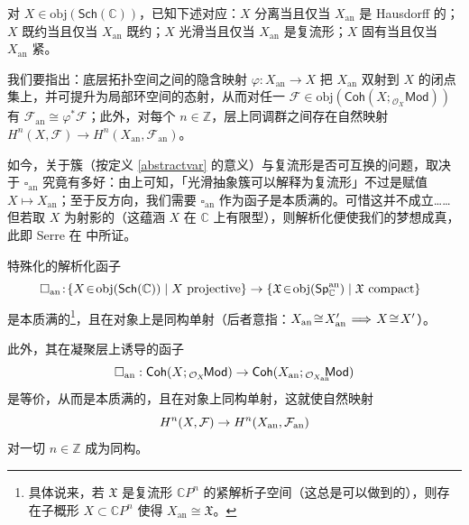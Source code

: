 对 $X\in\text{obj}(\mathsf{Sch}(\mathbb{C}))$，已知下述对应：$X$ 分离当且仅当 $X_\text{an}$ 是 Hausdorff 的；$X$ 既约当且仅当 $X_\text{an}$ 既约；$X$ 光滑当且仅当 $X_\text{an}$ 是复流形；$X$ 固有当且仅当 $X_\text{an}$ 紧。

我们要指出：底层拓扑空间之间的隐含映射 $\varphi:X_\text{an}\rightarrow X$ 把 $X_\text{an}$ 双射到 $X$ 的闭点集上，并可提升为局部环空间的态射，从而对任一 $\mathcal{F}\in\text{obj}(\mathsf{Coh}(X;{}_{\mathcal{O}_X}\!\mathsf{Mod}))$ 有 $\mathcal{F}_\text{an}\cong\varphi^*\mathcal{F}$；此外，对每个 $n\in\mathbb{Z}$，层上同调群之间存在自然映射 $H^n(X,\mathcal{F})\rightarrow H^n(X_\text{an},\mathcal{F}_\text{an})$。


如今，关于簇（按定义 \ref{abstractvar} 的意义）与复流形是否可互换的问题，取决于 $\square_\text{an}$ 究竟有多好：由上可知，「光滑抽象簇可以解释为复流形」不过是赋值 $X\mapsto X_\text{an}$；至于反方向，我们需要 $\square_\text{an}$ 作为函子是本质满的。可惜这并不成立……但若取 $X$ 为射影的（这蕴涵 $X$ 在 $\mathbb{C}$ 上有限型），则解析化便使我们的梦想成真，此即 Serre 在 \cite{[Ser56]} 中所证。

\begin{Thm}
	特殊化的解析化函子
	\begin{equation}\label{analytfunc}
		\mkern-12mu\square_\textup{an}\!:\!\{X\!\in\!\textup{obj}(\mathsf{Sch}(\mathbb{C}))\mid X\text{ projective}\}\rightarrow \{\mathfrak{X}\!\in\!\textup{obj}(\mathsf{Sp}_\mathbb{C}^\textup{an})\mid \mathfrak{X}\text{ compact}\}
	\end{equation}
	是本质满的\footnote{具体说来，若 $\mathfrak{X}$ 是复流形 $\mathbb{C}P^n$ 的紧解析子空间（这总是可以做到的），则存在子概形 $X\subset\mathbb{C}P^n$ 使得 $X_\text{an}\cong\mathfrak{X}$。}，且在对象上是同构单射（后者意指：$X_\textup{an}\!\cong\! X_\textup{an}'\!\implies\! X\!\cong\! X'$）。

	此外，其在凝聚层上诱导的函子
	\begin{equation}
		\square_\textup{an}:\mathsf{Coh}(X;{}_{\mathcal{O}_X}\!\mathsf{Mod})\rightarrow \mathsf{Coh}(X_\textup{an};{}_{\mathcal{O}_{X_\textup{an}}}\!\!\!\mathsf{Mod})
	\end{equation}
	是等价，从而是本质满的，且在对象上同构单射，这就使自然映射
	\[
	H^n(X,\mathcal{F})\rightarrow H^n(X_\textup{an},\mathcal{F}_\textup{an})
	\]
	对一切 $n\in\mathbb{Z}$ 成为同构。
\end{Thm}

